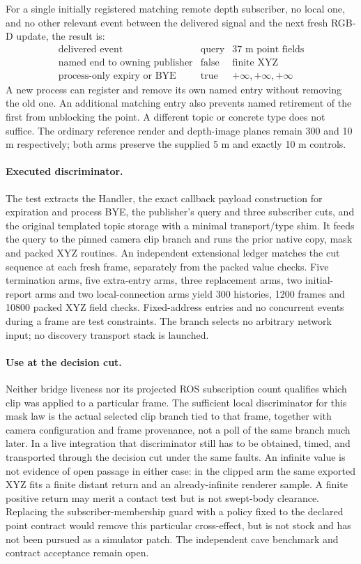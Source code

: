 \documentclass[11pt]{article}
\begin{document}
For a single initially registered matching remote depth subscriber,
no local one, and no other relevant event between the delivered signal
and the next fresh RGB-D update, the result is:
\[
\begin{array}{lcc}
\text{delivered event} & \text{query} & \text{37 m point fields}\\
\hline
\text{named end to owning publisher} & \text{false} & \text{finite XYZ}\\
\text{process-only expiry or BYE} & \text{true} & +\infty,+\infty,+\infty
\end{array}
\]
A new process can register and remove its own named entry without
removing the old one. An additional matching entry also prevents
named retirement of the first from unblocking the point. A different
topic or concrete type does not suffice. The ordinary reference render
and depth-image planes remain 300 and 10 m respectively; both arms
preserve the supplied 5 m and exactly 10 m controls.

\paragraph{Executed discriminator.}
The test extracts the Handler, the exact callback payload construction
for expiration and process BYE, the publisher's query and three
subscriber cuts, and the original templated topic storage with a minimal
transport/type shim. It feeds the query to the pinned camera clip branch
and runs the prior native copy, mask and packed XYZ routines. An
independent extensional ledger matches the cut sequence at each fresh
frame, separately from the packed value checks. Five termination arms,
five extra-entry arms, three replacement arms, two initial-report arms
and two local-connection arms yield 300 histories, 1200 frames and
10800 packed XYZ field checks. Fixed-address entries and no concurrent
events during a frame are test constraints. The branch selects no
arbitrary network input; no discovery transport stack is launched.

\paragraph{Use at the decision cut.}
Neither bridge liveness nor its projected ROS subscription count
qualifies which clip was applied to a particular frame. The sufficient
local discriminator for this mask law is the actual selected clip
branch tied to that frame, together with camera configuration and
frame provenance, not a poll of the same branch much later. In a live
integration that discriminator still has to be obtained, timed,
and transported through the decision cut under the same faults.
An infinite value is not evidence of open passage in either case:
in the clipped arm the same exported XYZ fits a finite distant return
and an already-infinite renderer sample. A finite positive return may
merit a contact test but is not swept-body clearance. Replacing the
subscriber-membership guard with a policy fixed to the declared
point contract would remove this particular cross-effect, but is not
stock and has not been pursued as a simulator patch. The independent
cave benchmark and contract acceptance remain open.
\end{document}
